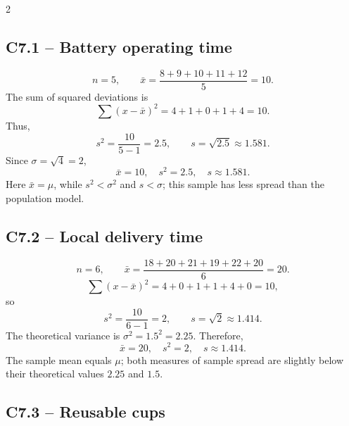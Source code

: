 	\setlength{\columnseprule}{0.4pt}
	\begin{multicols}{2}
		
		
		\subsection*{C7.1 -- Battery operating time}
		\label{subsec:c7-solution-batteries}
		
		\[
		n=5,\qquad
		\bar{x}=\frac{8+9+10+11+12}{5}=10.
		\]
		The sum of squared deviations is
		\[
		\sum(x-\bar{x})^2
		=4+1+0+1+4=10.
		\]
		Thus,
		\[
		s^2=\frac{10}{5-1}=2.5,\qquad
		s=\sqrt{2.5}\approx1.581.
		\]
		Since $\sigma=\sqrt{4}=2$,
		\[
		\boxed{\bar{x}=10,\quad s^2=2.5,\quad s\approx1.581.}
		\]
		Here $\bar{x}=\mu$, while $s^2<\sigma^2$ and $s<\sigma$; this sample has
		less spread than the population model.
		
		
		\subsection*{C7.2 -- Local delivery time}
		\label{subsec:c7-solution-deliveries}
		
		\[
		n=6,\qquad
		\bar{x}=\frac{18+20+21+19+22+20}{6}=20.
		\]
		\[
		\sum(x-\bar{x})^2=4+0+1+1+4+0=10,
		\]
		so
		\[
		s^2=\frac{10}{6-1}=2,\qquad
		s=\sqrt{2}\approx1.414.
		\]
		The theoretical variance is $\sigma^2=1.5^2=2.25$. Therefore,
		\[
		\boxed{\bar{x}=20,\quad s^2=2,\quad s\approx1.414.}
		\]
		The sample mean equals $\mu$; both measures of sample spread are slightly
		below their theoretical values $2.25$ and $1.5$.
		
		
		\subsection*{C7.3 -- Reusable cups}
		\label{subsec:c7-solution-cups}
		

\end{multicols}
